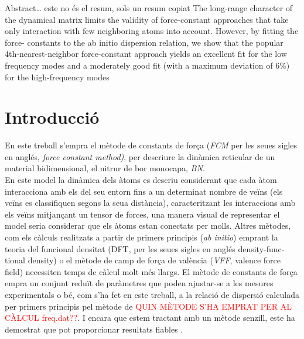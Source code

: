 \documentclass[12pt]{article} %
\begin{document}
\begin{otherlanguage}{english}\itshape

\noindent Abstract\ldots
este no és el resum, sols un resum copiat
The long-range character of the dynamical matrix limits the validity of
force-constant approaches that take only interaction with few neighboring atoms into account. However, by fitting the force-
constants to the ab initio dispersion relation, we show that the popular 4th-nearest-neighbor force-constant approach yields an
excellent fit for the low frequency modes and a moderately good fit (with a 
maximum deviation of $6 \%$) for the high-frequency modes \cite{wirtz04_phonon_disper_graph_revis}
\end{otherlanguage}



\section{Introducció}

En este treball s'empra el mètode de constants de força (\emph{FCM} per les seues sigles en anglés, \emph{\foreignlanguage{english}{force constant method})}, per descriure la dinàmica reticular de un material bidimensional, el nitrur de bor monocapa, \emph{BN}.\\

En este model la dinàmica dels àtoms es descriu considerant que cada àtom interacciona amb els del seu entorn fins a un determinat nombre de veïns (els veïns es classifiquen segons la seua distància), caracteritzant les interaccions amb els veïns mitjançant un tensor de forces, una manera visual de representar el model seria considerar que els àtoms estan conectats per molls. Altres mètodes, com els càlculs realitzats a partir de primers principis (\emph{ab initio}) emprant la teoria del funcional densitat (DFT, per les seues sigles en anglés \foreignlanguage{english}{density-functional density}) o el mètode de camp de força de valència (\emph{VFF}, \foreignlanguage{english}{valence force field}) necessiten temps de càlcul molt més llargs. El mètode de constants de força empra un conjunt reduït de paràmetres que poden ajustar-se a les mesures experimentals o bé, com s'ha fet en este treball, a la relació de dispersió calculada per primers principis pel mètode de \textcolor{red}{QUIN MÈTODE S'HA EMPRAT PER AL CÀLCUL freq.dat??}.  I encara que estem tractant amb un mètode senzill, este ha demostrat que pot proporcionar resultats fiables \cite{wirtz04_phonon_disper_graph_revis}.
\end{document}
